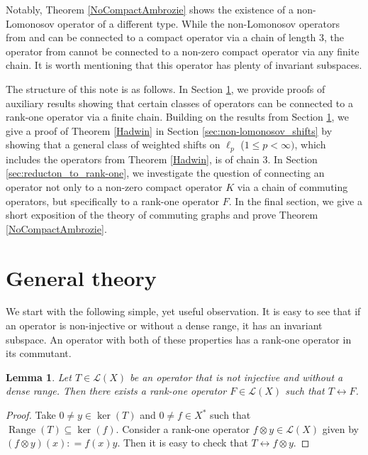 \documentclass[a4paper,12pt]{article}
\newtheorem{lemma}[thm]{Lemma}
\theoremstyle{definition}
\numberwithin{equation}{section}
\numberwithin{thm}{section}
\begin{document}
Notably, Theorem \ref{NoCompactAmbrozie} shows the existence of a non-Lomonosov operator of a different type. While the non-Lomonosov operators from \cite{Hadwin} and \cite{Read1986} can be connected to a compact operator via a chain of length $3$, the operator from \cite{Ambrozie} cannot be connected to a non-zero compact operator via any finite chain. It is worth mentioning that this operator has plenty of invariant subspaces.

The structure of this note is as follows. In Section \ref{sec:general_theory}, we provide proofs of auxiliary results showing that certain classes of operators can be connected to a rank-one operator via a finite chain. Building on the results from Section \ref{sec:general_theory}, we give a proof of Theorem \ref{Hadwin} in Section \ref{sec:non-lomonosov_shifts} by showing that a general class of weighted shifts on $\ell_p$ ($1\leq p<\infty)$, which includes the operators from Theorem \ref{Hadwin}, is of chain $3$. In Section \ref{sec:reducton_to_rank-one}, we investigate the question of connecting an operator not only to a non-zero compact operator $K$ via a chain of commuting operators, but specifically to a rank-one operator $F$. In the final section, we give a short exposition of the theory of commuting graphs and prove Theorem \ref{NoCompactAmbrozie}.

\section{General theory}
\label{sec:general_theory}

We start with the following simple, yet useful observation. It is easy to see that if an operator is non-injective or without a dense range, it has an invariant subspace. An operator with both of these properties has a rank-one operator in its commutant.
\begin{lemma}
\label{InjectiveDenseRange}
Let $T\in \mathcal{L}(X)$ be an operator that is not injective and without a dense range. Then there exists a rank-one operator $F\in \mathcal{L}(X)$ such that $T \leftrightarrow F$. 
\end{lemma}
\begin{proof}
Take $0\neq y\in \ker(T)$ and $0\neq f\in X^*$ such that $\operatorname{Range}(T) \subseteq \ker(f)$. Consider a rank-one operator $f\otimes y\in \mathcal{L}(X)$ given by $(f\otimes y)(x): = f(x)y$. Then it is easy to check that $T \leftrightarrow f\otimes y$.
\end{proof}
\end{document}
